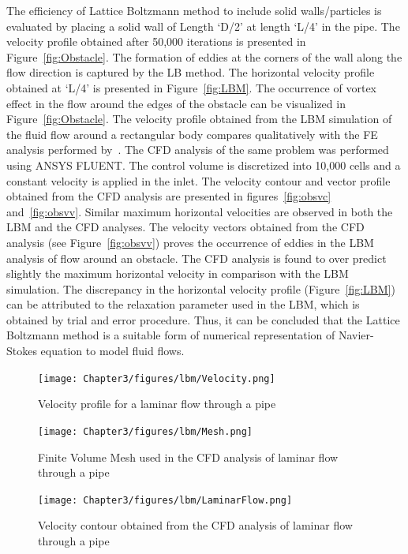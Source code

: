 The efficiency of Lattice Boltzmann method to include solid walls/particles is evaluated by placing a solid wall of Length `D/2' at length `L/4' in the pipe. The velocity profile obtained after 50,000 iterations is presented in Figure~\ref{fig:Obstacle}. The formation of eddies at the corners of the wall along the flow direction is captured by the LB method. The horizontal velocity profile obtained at `L/4' is presented in Figure~\ref{fig:LBM}. The occurrence of vortex effect in the flow around the edges of the obstacle can be visualized in Figure~\ref{fig:Obstacle}. The velocity profile obtained from the LBM simulation of the fluid flow around a rectangular body compares qualitatively with the FE analysis performed by~\citet{zhong1991}. The CFD analysis of the same problem was performed using ANSYS FLUENT. The control volume is discretized into 10,000 cells and a constant velocity is applied in the inlet. The velocity contour and vector profile obtained from the CFD analysis are presented in figures~\ref{fig:obsvc} and~\ref{fig:obsvv}. Similar maximum horizontal velocities are observed in both the LBM and the CFD analyses. The velocity vectors obtained from the CFD analysis (see Figure~\ref{fig:obsvv}) proves the occurrence of eddies in the LBM analysis of flow around an obstacle. The CFD analysis is found to over predict slightly the maximum horizontal velocity in comparison with the LBM simulation. The discrepancy in the horizontal velocity profile (Figure~\ref{fig:LBM}) can be attributed to the relaxation parameter used in the LBM, which is obtained by trial and error procedure. Thus, it can be concluded that the Lattice Boltzmann method is a suitable form of numerical representation of Navier-Stokes equation to model fluid flows. 
\begin{figure}[htbp]
\centering
\texttt{[image: Chapter3/figures/lbm/Velocity.png]}
\caption{Velocity profile for a laminar flow through a pipe}
\label{fig:vel}
\end{figure}

\begin{figure}[htbp]
\centering
\texttt{[image: Chapter3/figures/lbm/Mesh.png]}
\caption{Finite Volume Mesh used in the CFD analysis of laminar flow through a pipe}
\label{fig:mesh}
\end{figure}


\begin{figure}[htbp]
\centering
\texttt{[image: Chapter3/figures/lbm/LaminarFlow.png]}
\caption{Velocity contour obtained from the CFD analysis of laminar flow through a pipe}
\label{fig:cont}
\end{figure}



